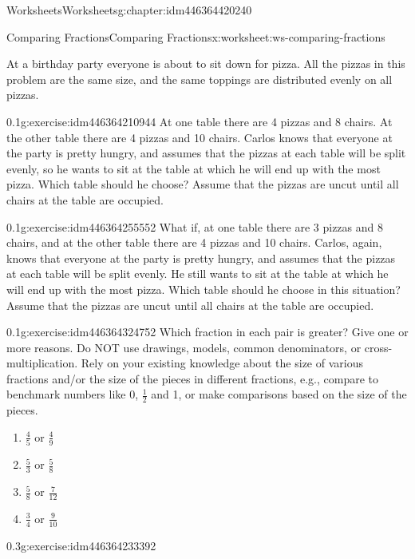 \documentclass[twoside,11pt,]{book}
\begin{document}
\begin{chapterptx}{Worksheets}{}{Worksheets}{}{}{g:chapter:idm446364420240}
\begin{worksheet-section-numberless}{Comparing Fractions}{}{Comparing Fractions}{}{}{x:worksheet:ws-comparing-fractions}
\begin{introduction}{}%
At a birthday party everyone is about to sit down for pizza.  All the pizzas in this problem are the same size, and the same toppings are distributed evenly on all pizzas.%
\end{introduction}%
\begin{divisionexercise}{1}{}{0.1}{g:exercise:idm446364210944}%
At one table there are 4 pizzas and 8 chairs.  At the other table there are 4 pizzas and 10 chairs.  Carlos knows that everyone at the party is pretty hungry, and assumes that the pizzas at each table will be split evenly, so he wants to sit at the table at which he will end up with the most pizza.  Which table should he choose?  Assume that the pizzas are uncut until all chairs at the table are occupied.%
\end{divisionexercise}%
\begin{divisionexercise}{2}{}{0.1}{g:exercise:idm446364255552}%
What if, at one table there are 3 pizzas and 8 chairs, and at the other table there are 4 pizzas and 10 chairs.  Carlos, again, knows that everyone at the party is pretty hungry, and assumes that the pizzas at each table will be split evenly.  He still wants to sit at the table at which he will end up with the most pizza.  Which table should he choose in this situation? Assume that the pizzas are uncut until all chairs at the table are occupied.%
\end{divisionexercise}%
\begin{divisionexercise}{3}{}{0.1}{g:exercise:idm446364324752}%
Which fraction in each pair is greater?  Give one or more reasons.  Do NOT use drawings, models, common denominators, or cross-multiplication.  Rely on your existing knowledge about the size of various fractions and\slash{}or the size of the pieces in different fractions, e.g., compare to benchmark numbers like 0, \(\frac{1}{2} \) and 1, or make comparisons based on the size of the pieces.%
%
\begin{enumerate}[label=(\alph*)]
\item{}\(\frac{4}{5} \) or \(\frac{4}{9} \)%
\item{}\(\frac{5}{3} \) or \(\frac{5}{8} \)%
\item{}\(\frac{5}{8} \) or \(\frac{7}{12} \)%
\item{}\(\frac{3}{4} \) or \(\frac{9}{10} \)%
\end{enumerate}
\end{divisionexercise}%
\clearpage
\begin{divisionexercise}{4}{}{0.3}{g:exercise:idm446364233392}%

\end{divisionexercise}
\end{worksheet-section-numberless}
\end{chapterptx}
\end{document}
